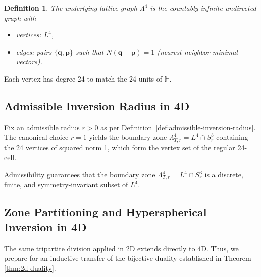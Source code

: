 \documentclass{article}
\newtheorem{definition}{Definition}
\begin{document}
\begin{definition}
\label{def:4d-lattice-graph}
The \emph{underlying lattice graph} \(\Lambda^4\) is the countably infinite undirected graph with
\begin{itemize}
  \item vertices: \(L^4\),
  \item edges: pairs \(\{\mathbf{q}, \mathbf{p}\}\) such that \(N(\mathbf{q} - \mathbf{p}) = 1\) (nearest-neighbor minimal vectors).
\end{itemize}
\end{definition}
Each vertex has degree 24 to match the 24 units of \(\mathbb{H}\).

\subsection{Admissible Inversion Radius in 4D}
\label{subsec:4d-admissible-inversion-radius}
Fix an admissible radius $r > 0$ as per Definition~\ref{def:admissible-inversion-radius}. The canonical choice $r = 1$ yields the boundary zone $\Lambda_{T,r}^4 = L^4 \cap S_r^3$ containing the 24 vertices of squared norm 1, which form the vertex set of the regular 24-cell.

Admissibility guarantees that the boundary zone $\Lambda_{T,r}^4 = L^4 \cap S_r^3$ is a discrete, finite, and symmetry-invariant subset of $L^4$.

\subsection{Zone Partitioning and Hyperspherical Inversion in 4D}
\label{subsec:4d-zone-partitioning}
The same tripartite division applied in 2D extends directly to 4D. Thus, we prepare for an inductive transfer of the bijective duality established in Theorem \ref{thm:2d-duality}.
\end{document}

